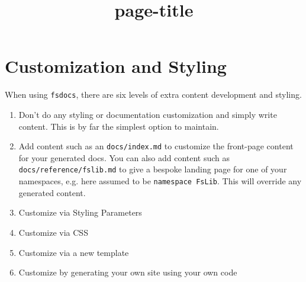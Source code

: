 \documentclass{article}
\title{{page-title}}
\date{}
\begin{document}
\maketitle


\section*{Customization and Styling}



When using \texttt{fsdocs}, there are six levels of extra content development and styling.
\begin{enumerate}
\item 

Don't do any styling or documentation customization and simply write content. This is by far the simplest option to
maintain.

\item 

Add content such as an \texttt{docs/index.md} to customize the front-page content for your generated docs.
You can also add content such as \texttt{docs/reference/fslib.md} to give a bespoke landing page
for one of your namespaces, e.g. here assumed to be \texttt{namespace FsLib}. This will override any
generated content.

\item 

Customize via Styling Parameters

\item 

Customize via CSS

\item 

Customize via a new template

\item 

Customize by generating your own site using your own code

\end{enumerate}
\end{document}
